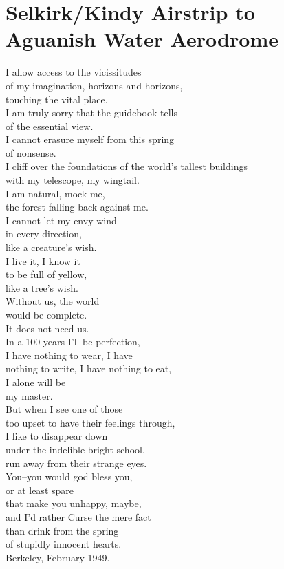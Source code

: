\documentclass[smalldemyvopaper,11pt,twoside,onecolumn,openright,extrafontsizes]{memoir}
\begin{document}
\chapter{Selkirk/Kindy Airstrip to Aguanish Water Aerodrome}
I allow access to the vicissitudes
\\of my imagination, horizons and horizons,
\\touching the vital place.
\\I am truly sorry that the guidebook tells
\\of the essential view.
\\I cannot erasure myself from this spring
\\of nonsense.
\\I cliff over the foundations of the world's tallest buildings
\\with my telescope, my wingtail.
\\I am natural, mock me,
\\the forest falling back against me.
\\I cannot let my envy wind
\\in every direction,
\\like a creature's wish.
\\I live it, I know it
\\to be full of yellow,
\\like a tree's wish.
\\Without us, the world
\\would be complete.
\\It does not need us.
\\In a 100 years I'll be perfection,
\\I have nothing to wear, I have
\\nothing to write, I have nothing to eat,
\\I alone will be
\\my master.
\\But when I see one of those
\\too upset to have their feelings through,
\\I like to disappear down
\\under the indelible bright school,
\\run away from their strange eyes.
\\You--you would god bless you,
\\or at least spare
\\that make you unhappy, maybe,
\\and I'd rather Curse the mere fact
\\than drink from the spring
\\of stupidly innocent hearts.
\\Berkeley, February 1949.
\end{document}
